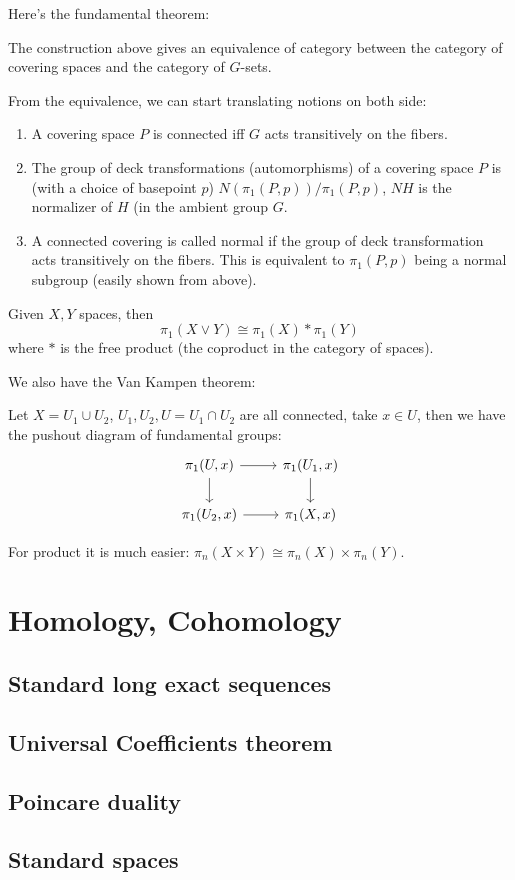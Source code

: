 \documentclass[main.tex]{subfiles}
\begin{document}
Here's the fundamental theorem:
\begin{theorem}
The construction above gives an equivalence of category between the category of covering spaces and the category of $G$-sets.
\end{theorem}

\begin{remark}
From the equivalence, we can start translating notions on both side:

\begin{enumerate}
    \item A covering space $P$ is connected iff $G$ acts transitively on the fibers.
    \item The group of deck transformations (automorphisms) of a covering space $P$ is (with a choice of basepoint $p$) $N(\pi_1(P,p))/\pi_1(P,p)$, $NH$ is the normalizer of $H$ (in the ambient group $G$.
    \item A connected covering is called normal if the group of deck transformation acts transitively on the fibers. This is equivalent to $\pi_1(P,p)$ being a normal subgroup (easily shown from above).
\end{enumerate}
\end{remark}

Given $X, Y$ spaces, then 
$$
\pi_1(X \vee Y) \cong \pi_1(X) * \pi_1(Y)
$$
where $*$ is the free product (the coproduct in the category of spaces).

We also have the Van Kampen theorem:
\begin{theorem}
Let $X = U_1 \cup U_2$, $U_1, U_2, U = U_1 \cap U_2$ are all connected, take $x \in U$, then we have the pushout diagram of fundamental groups:
\begin{equation}
    \begin{tikzcd}
\pi_1 (U, x) \arrow[r] \arrow[d]
& \pi_1 (U_1, x) \arrow[d] \\
\pi_1(U_2, x) \arrow[r]
& \pi_1(X,x)
\end{tikzcd}
\end{equation}
\end{theorem}

For product it is much easier:
$\pi_n(X \times Y) \cong \pi_n(X) \times \pi_n(Y)$.

\section{Homology, Cohomology}
\subsection{Standard long exact sequences}

\subsection{Universal Coefficients theorem}


\subsection{Poincare duality}


\subsection{Standard spaces}
\end{document}

